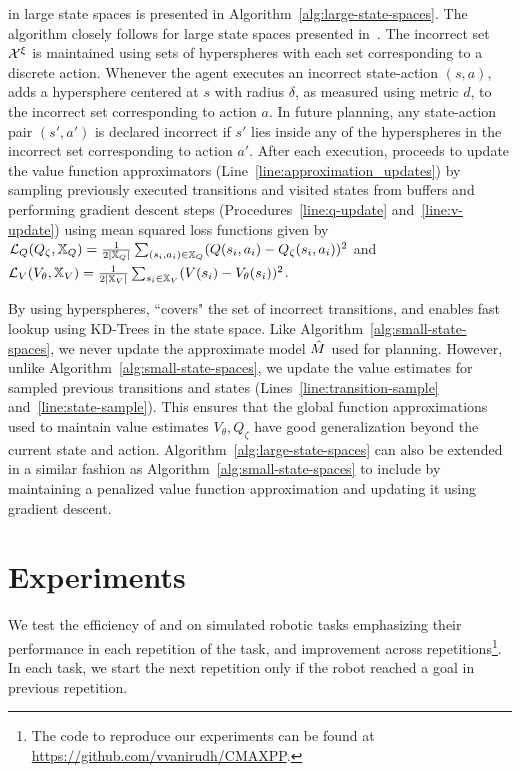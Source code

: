 \cmaxpp{} in large state spaces is presented in
Algorithm~\ref{alg:large-state-spaces}. The algorithm closely follows
\cmax{} for large state spaces presented in~\cite{cmax}. The
incorrect set $\mathcal{X}^\xi$ is maintained using sets of
hyperspheres with each set corresponding to a discrete
action. Whenever the agent executes an incorrect state-action $(s,
a)$, \cmaxpp{} adds a hypersphere centered at $s$ with radius
$\delta$, as measured using metric $d$, to the incorrect set
corresponding to action $a$. In future
planning, any state-action pair $(s', a')$ is declared incorrect if
$s'$ lies inside any of the hyperspheres in the incorrect set
corresponding to action $a'$.
After each execution, \cmaxpp{} proceeds to update the value
function approximators (Line~\ref{line:approximation_updates}) by
sampling previously executed transitions and visited states from
buffers and performing gradient descent steps
(Procedures~\ref{line:q-update} and~\ref{line:v-update}) using mean
squared loss
functions given by $\mathcal{L}_Q(Q_\zeta, \mathbb{X}_Q) =
                                     \frac{1}{2|\mathbb{X}_Q|}\sum_{(s_i,
                                     a_i) \in \mathbb{X}_Q} (Q(s_i,
                                     a_i) - Q_\zeta(s_i, a_i))^2$ and $\mathcal{L}_V(V_\theta, \mathbb{X}_V) = \frac{1}{2|\mathbb{X}_V|}\sum_{s_i \in \mathbb{X}_V} (V(s_i) - V_\theta(s_i))^2$.

By using hyperspheres, \cmaxpp{} ``covers" the set of incorrect
transitions, and enables fast lookup using KD-Trees in the state
space. Like
Algorithm~\ref{alg:small-state-spaces}, we never update the
approximate model $\hat{M}$ used for planning. However, unlike
Algorithm~\ref{alg:small-state-spaces}, we update the value estimates
for sampled previous transitions and states
(Lines~\ref{line:transition-sample} and~\ref{line:state-sample}). This ensures that the
global function approximations used to maintain value estimates
$V_\theta, Q_\zeta$ have good generalization beyond the current state
and action. Algorithm~\ref{alg:large-state-spaces} can also be extended in a similar fashion as Algorithm~\ref{alg:small-state-spaces} to include \acmaxpp{} by maintaining a penalized value function approximation and updating it using gradient descent.


\section{Experiments}
\label{sec:experiments}

We test the efficiency of \cmaxpp{} and \acmaxpp{} on
simulated robotic tasks emphasizing their performance in each
repetition of the task, and improvement across
repetitions\footnote{The code to reproduce our experiments can be 
found at \url{https://github.com/vvanirudh/CMAXPP}.}. In each
task, we start the next repetition only if the robot reached a goal in
previous repetition.


